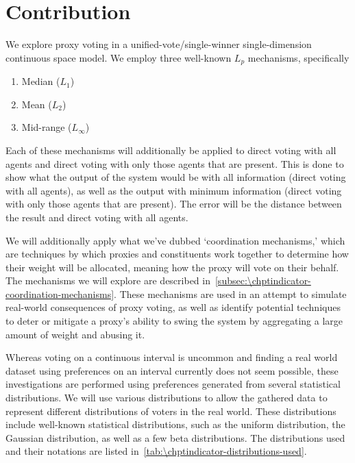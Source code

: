 \section{Contribution}\label{sec:\chptindicator-contribution} %
We explore proxy voting in a unified-vote/single-winner single-dimension
continuous space model.
We employ three well-known $L_p$ mechanisms, specifically
\begin{enumerate}
    \item {
        Median ($L_1$)
    }
    \item {
        Mean ($L_2$)
    }
    \item {
        Mid-range ($L_\infty$)
    }
\end{enumerate}
Each of these mechanisms will additionally be applied to direct voting with all
agents and direct voting with only those agents that are present.
This is done to show what the output of the system would be with all information
(direct voting with all agents), as well as the output with minimum information
(direct voting with only those agents that are present).
The error will be the distance between the result and direct voting with all agents.

We will additionally apply what we've dubbed `coordination mechanisms,' which are
techniques by which proxies and constituents work together to determine how their
weight will be allocated, meaning how the proxy will vote on their behalf.
The mechanisms we will explore are described
in~\autoref{subsec:\chptindicator-coordination-mechanisms}.
These mechanisms are used in an attempt to simulate real-world consequences of proxy
voting, as well as identify potential techniques to deter or mitigate a proxy's
ability to swing the system by aggregating a large amount of weight and abusing it.

Whereas voting on a continuous interval is uncommon and finding a real world dataset
using preferences on an interval currently does not seem possible, these investigations
are performed using preferences generated from several statistical distributions.
We will use various distributions to allow the gathered data to represent
different distributions of voters in the real world.
These distributions include well-known statistical distributions, such as the uniform
distribution, the Gaussian distribution, as well as a few beta distributions.
The distributions used and their notations are listed
in~\autoref{tab:\chptindicator-distributions-used}.


